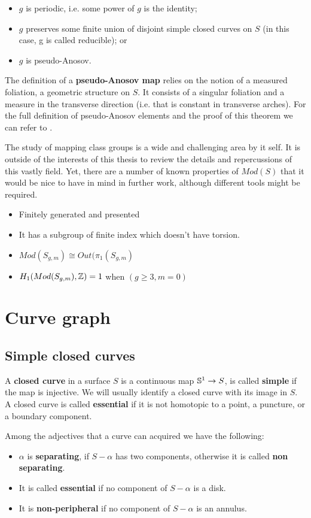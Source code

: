 \begin{itemize}
\item $g$ is periodic, i.e. some power of $g$ is the identity;
\item $g$ preserves some finite union of disjoint simple closed curves on $S$ (in this case, g is called reducible); or
\item $g$ is pseudo-Anosov.
\end{itemize}

The definition of a \textbf{pseudo-Anosov map} relies on the notion of a measured foliation, a geometric structure on $S$. It consists of a singular foliation and a measure in the transverse direction (i.e. that is constant in transverse arches). For the full definition of pseudo-Anosov elements and the proof of this theorem we can refer to \cite[Farb, Chapter 13]{Farb}.

The study of mapping class groups is a wide and challenging area by it self. It is outside of the interests of this thesis to review the details and repercussions of this vastly field. Yet, there are a number of known properties of $Mod(S)$ that it would be nice to have in mind in further work, although different tools might be required.

\begin{itemize}
\item Finitely generated and presented
\item It has a subgroup of finite index which doesn't have torsion.
\item $Mod(S_{g,m}) \cong Out(\pi_{1}(S_{g,m})$
\item $H_{1}(Mod(S_{g,m}), \Z) = 1$ when $(g\geq3, m=0)$
\end{itemize}

\section{Curve graph}

\subsection{Simple closed curves}

\begin{defini}
A \textbf{closed curve} in a surface $S$ is a continuous map $\S^{1}\to S$, is called \textbf{simple} if the map is injective. We will usually identify a closed curve with its image in $S$. A closed curve is called \textbf{essential} if it is not homotopic to a point, a puncture, or a boundary component.
\end{defini}
Among the adjectives that a curve can acquired we have the following:
\begin{itemize}
    \item $\alpha$ is \textbf{separating}, if $S-\alpha$ has two components, otherwise it is called \textbf{non separating}.
    \item It is called \textbf{essential} if no component of $S- \alpha$ is a disk.
    \item It is \textbf{non-peripheral} if no component of $S - \alpha$ is an annulus. 
\end{itemize}


